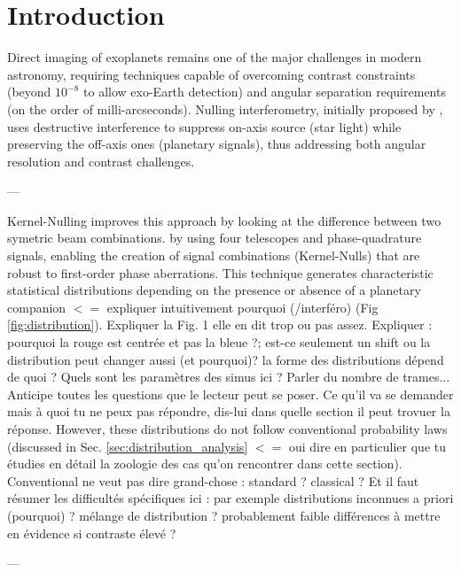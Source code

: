 \documentclass{article}
\newcommand{\dm}[1]{{\color{mulberry} #1}}
\begin{document}
\section{Introduction}

Direct imaging of exoplanets remains one of the major challenges in modern astronomy, requiring techniques capable of overcoming contrast constraints (beyond $10^{-8}$ to allow exo-Earth detection) and angular separation requirements (on the order of milli-arcseconds). Nulling interferometry, initially proposed by \cite{Bracewell1979}, uses destructive interference to suppress on-axis source (star light) while preserving the off-axis ones (planetary signals), thus addressing both angular resolution and contrast challenges.

---

Kernel-Nulling \cite{Martinache2018} improves this approach by looking  at the difference between two symetric beam combinations. by using four telescopes and phase-quadrature signals, enabling the creation of signal combinations (Kernel-Nulls) that are robust to first-order phase aberrations. This technique generates characteristic statistical distributions depending on the presence or absence of a planetary companion \dm{$<= $ expliquer intuitivement pourquoi (/interféro)} (Fig \ref{fig:distribution}).\dm{Expliquer la Fig. 1 elle en dit trop ou pas assez. Expliquer : pourquoi la rouge est centrée et pas la bleue ?; est-ce seulement un shift ou la distribution peut changer aussi (et pourquoi)? la forme des distributions  dépend de quoi ? Quels sont les paramètres des simus ici ? Parler du nombre de trames... Anticipe toutes les questions que le lecteur peut se poser. Ce qu'il va se demander mais à quoi tu ne peux pas répondre, dis-lui dans quelle section il peut trovuer la réponse. } However, these distributions do not follow conventional probability laws (discussed in Sec. \ref{sec:distribution_analysis}\dm{$<=$ oui dire en particulier que tu étudies en détail la zoologie des cas qu'on rencontrer dans cette section}).\dm{Conventional ne veut pas dire grand-chose : standard ? classical ? Et il faut résumer les difficultés spécifiques ici : par exemple  distributions inconnues a priori (pourquoi) ? mélange de distribution ? probablement faible différences à mettre en évidence si contraste élevé ?}

---
\end{document}
